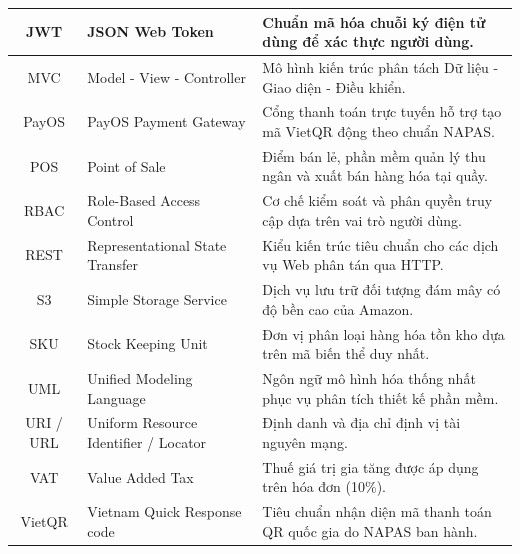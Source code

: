 \begin{longtable}{|c|p{3.5cm}|p{9cm}|}
JWT & JSON Web Token & Chuẩn mã hóa chuỗi ký điện tử dùng để xác thực người dùng. \\ \hline
MVC & Model - View - Controller & Mô hình kiến trúc phân tách Dữ liệu - Giao diện - Điều khiển. \\ \hline
PayOS & PayOS Payment Gateway & Cổng thanh toán trực tuyến hỗ trợ tạo mã VietQR động theo chuẩn NAPAS. \\ \hline
POS & Point of Sale & Điểm bán lẻ, phần mềm quản lý thu ngân và xuất bán hàng hóa tại quầy. \\ \hline
RBAC & Role-Based Access Control & Cơ chế kiểm soát và phân quyền truy cập dựa trên vai trò người dùng. \\ \hline
REST & Representational State Transfer & Kiểu kiến trúc tiêu chuẩn cho các dịch vụ Web phân tán qua HTTP. \\ \hline
S3 & Simple Storage Service & Dịch vụ lưu trữ đối tượng đám mây có độ bền cao của Amazon. \\ \hline
SKU & Stock Keeping Unit & Đơn vị phân loại hàng hóa tồn kho dựa trên mã biến thể duy nhất. \\ \hline
UML & Unified Modeling Language & Ngôn ngữ mô hình hóa thống nhất phục vụ phân tích thiết kế phần mềm. \\ \hline
URI / URL & Uniform Resource Identifier / Locator & Định danh và địa chỉ định vị tài nguyên mạng. \\ \hline
VAT & Value Added Tax & Thuế giá trị gia tăng được áp dụng trên hóa đơn (10\%). \\ \hline
VietQR & Vietnam Quick Response code & Tiêu chuẩn nhận diện mã thanh toán QR quốc gia do NAPAS ban hành. \\
\end{longtable}

\cleardoublepage
\tableofcontents

\cleardoublepage
\listoffigures
{}

\cleardoublepage
\listoftables
{}
